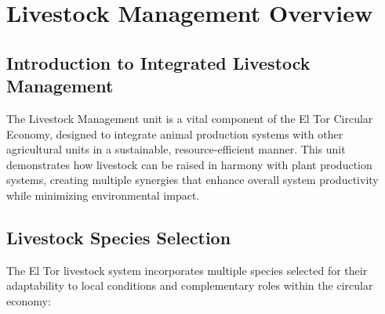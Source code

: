 \section{Livestock Management Overview}

\subsection{Introduction to Integrated Livestock Management}

The Livestock Management unit is a vital component of the El Tor Circular Economy, designed to integrate animal production systems with other agricultural units in a sustainable, resource-efficient manner. This unit demonstrates how livestock can be raised in harmony with plant production systems, creating multiple synergies that enhance overall system productivity while minimizing environmental impact.

\subsection{Livestock Species Selection}

The El Tor livestock system incorporates multiple species selected for their adaptability to local conditions and complementary roles within the circular economy:

